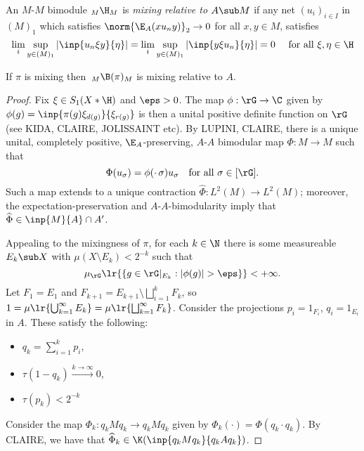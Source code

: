 \documentclass[12pt]{article}
\begin{document}
\begin{definition}
 An $ M $-$ M $ bimodule $ _M \H_{M} $ is {\it mixing relative to $ A\sub M $} if any net $ (u_{i})_{i\in I} $ in $ (M)_{1} $ which satisfies $ \norm{\E_{A}(xu_{n}y)}_{2}\to 0 $ for all $ x,y\in M $, satisfies
\[
    \lim_{i} \sup_{y\in(M)_{1}} |\inp{u_{n} \xi y}{\eta}| =\lim_{i} \sup_{y\in(M)_{1}} |\inp{y \xi u_{n} }{\eta}| =  0 \quad\text{ for all } \xi, \eta\in \H
\]
\end{definition}


\begin{proposition}
    If $ \pi $ is mixing then $\,_M \B(\pi)_{M} $ is mixing relative to $ A $.
\end{proposition}

\begin{proof}
    Fix $ \xi \in S_{1}(X\ast\H) $ and $ \eps>0 $. The map $ \phi:\rG\to \C $ given by $ \phi(g) = \inp{\pi(g) \xi_{d(g)}}{\xi_{r(g)}} $ is then a unital positive definite function on $ \rG $ (see KIDA, CLAIRE, JOLISSAINT etc).
    By LUPINI, CLAIRE, there is a unique unital, completely positive, $ \E_{A} $-preserving, $ A $-$ A $ bimodular map $ \Phi:M\to M $ such that 
    \[
        \Phi(u_{\sigma}) = \phi(\cdot\, \sigma) u_{\sigma} \quad \text{for all } \sigma\in[\rG].
    \]
    Such a map extends to a unique contraction $ \widehat{\Phi}: L^{2}(M)\to L^2(M) $; moreover, the expectation-preservation and $ A $-$ A $-bimodularity imply that $ \widehat{\Phi}\in \inp{M}{A}\cap A^{\prime} $.
    

    Appealing to the mixingness of $ \pi $, for each $ k\in \N $ there is some measureable $ E_{k}\sub X $ with $ \mu(X\setminus E_{k})  <  2^{-k} $ such that  
    \[
      \mu_{\rG}\lr{\{g\in \rG\vert_{E_{k}}: | \phi(g)| >\eps\}} < +\infty.
    \]
    Let $ F_{1} = E_{1} $ and $ F_{k+1} = E_{k+1}\setminus \bigsqcup_{i=1}^{k}F_{k} $, so $ 1 = \mu\lr{\bigcup_{k=1}^{\infty}E_{k}} = \mu\lr{\bigsqcup_{k=1}^{\infty}F_{k}} $. Consider the projections $ p_{i} = 1_{F_{i}} $, $ q_{i} = 1_{E_{i}} $ in $ A $. These satisfy the following:
    \begin{itemize}
      \item $ q_{k} = \sum_{i=1}^{k} p_{i} $,
      \item $ \tau(1-q_{k}) \xrightarrow{k\to\infty} 0$,
      \item $ \tau(p_{k}) < 2^{-k} $
    \end{itemize}
    Consider the map $ \Phi_{k}: q_{k}M q_{k}\to q_{k}Mq_{k} $ given by $ \Phi_{k}(\cdot) = \Phi(q_{k}\cdot q_{k}) $. By CLAIRE, we have that $ \widehat{\Phi}_{k}\in \K(\inp{q_{k}M q_{k}}{q_{k}A q_{k}}) $. 
    


\end{proof}
\end{document}
